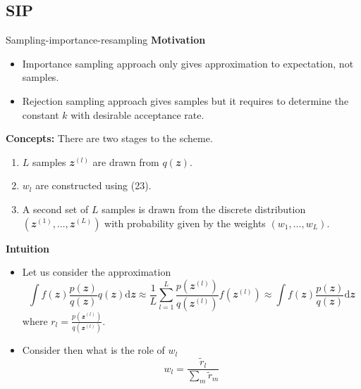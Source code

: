 \documentclass{bredelebeamer}
\begin{document}
\subsection{SIP}
\begin{frame}{Sampling-importance-resampling}
  \textbf{Motivation}
  \begin{itemize}
    \item Importance sampling approach only gives approximation
    to expectation, not samples.
    \item Rejection sampling approach gives samples but it requires
    to determine the constant $k$ with desirable acceptance rate.
  \end{itemize}

  \textbf{Concepts:} There are two stages to the scheme.
  \begin{enumerate}
    \item $L$ samples $\mathbfit{z}^{(l)}$ are drawn from $q(\mathbfit{z})$.
    \item $w_l$ are constructed using (23).
    \item A second set of $L$ samples is drawn from the discrete
    distribution $(\mathbfit{z}^{(1)}, \ldots, \mathbfit{z}^{(L)})$ with
    probability given by the weights $(w_1, \ldots, w_L)$.
  \end{enumerate}

  \textbf{Intuition}
  \begin{itemize}
    \item Let us consider the approximation
    \begin{equation}
      \int f(\mathbfit{z}) \frac{p(\mathbfit{z})}{q(\mathbfit{z})} q(\mathbfit{z}) \mathrm{d}\mathbfit{z}
      \approx \frac{1}{L} \sum_{l=1}^{L} \frac{p(\mathbfit{z}^{(l)})}{q(\mathbfit{z}^{(l)})} f(\mathbfit{z}^{(l)})
      \approx \int f(\mathbfit{z}) \frac{p(\mathbfit{z})}{q(\mathbfit{z})} \mathrm{d}\mathbfit{z}
    \end{equation}
    where $r_l = \frac{p(\mathbfit{z}^{(l)})}{q(\mathbfit{z}^{(l)})}$.
    \item Consider then what is the role of $w_l$
    \begin{equation}
      w_l = \frac{\tilde{r}_l}{\sum_{m} \tilde{r}_m}
    \end{equation}
  \end{itemize}
\end{frame}
\end{document}
